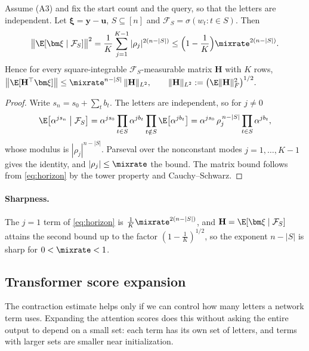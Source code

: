 \begin{lemma}
\label{lem:target-contraction}
Assume (A3) and fix the start count and the query, so that the letters are independent. Let $\bm\xi=\bm y-\bm u$, $S\subseteq[n]$ and $\mathcal F_S=\sigma(w_t:t\in S)$. Then
\begin{equation}
 \bigl\|\E[\bm\xi\mid\mathcal F_S]\bigr\|^2=\frac{1}{K}\sum_{j=1}^{K-1}|\rho_j|^{2(n-|S|)}\le\Bigl(1-\frac{1}{K}\Bigr)\mixrate^{2(n-|S|)} .
 \label{eq:horizon}
\end{equation}
Hence for every square-integrable $\mathcal F_S$-measurable matrix $\mathbf H$ with $K$ rows,
 $\bigl\|\E[\mathbf H^\top\bm\xi]\bigr\|\le\mixrate^{n-|S|}\,\|\mathbf H\|_{L^2},\qquad \|\mathbf H\|_{L^2}:=\bigl(\E\|\mathbf H\|_F^2\bigr)^{1/2}.$ 
\end{lemma}

\begin{proof}
Write $s_n=s_0+\sum_tb_t$. The letters are independent, so for $j\ne0$
\[
 \E\bigl[\alpha^{js_n}\bigm|\mathcal F_S\bigr]=\alpha^{js_0}\prod_{t\in S}\alpha^{jb_t}\prod_{t\notin S}\E\bigl[\alpha^{jb_t}\bigr]=\alpha^{js_0}\,\rho_j^{\,n-|S|}\prod_{t\in S}\alpha^{jb_t},
\]
whose modulus is $|\rho_j|^{n-|S|}$. Parseval over the nonconstant modes $j=1,\ldots,K-1$ gives the identity, and $|\rho_j|\le\mixrate$ the bound.
The matrix bound follows from \cref{eq:horizon} by the tower property
and Cauchy--Schwarz.
\end{proof}

\paragraph{Sharpness.}\label{rem:tight} The $j=1$ term of \cref{eq:horizon} is $\frac{1}{K}\mixrate^{2(n-|S|)}$, and $\mathbf H=\E[\bm\xi\mid\mathcal F_S]$ attains the second bound up to the
factor $(1-\frac{1}{K})^{1/2}$, so the exponent $n-|S|$ is sharp for $0<\mixrate<1$.

\subsection{Transformer score expansion}
\label{app:model-spectrum}

The contraction estimate helps only if we can control how many letters a network term uses. Expanding the attention scores does
this without asking the entire output to depend on a small set: each term has its own set of letters, and terms with larger sets
are smaller near initialization.

